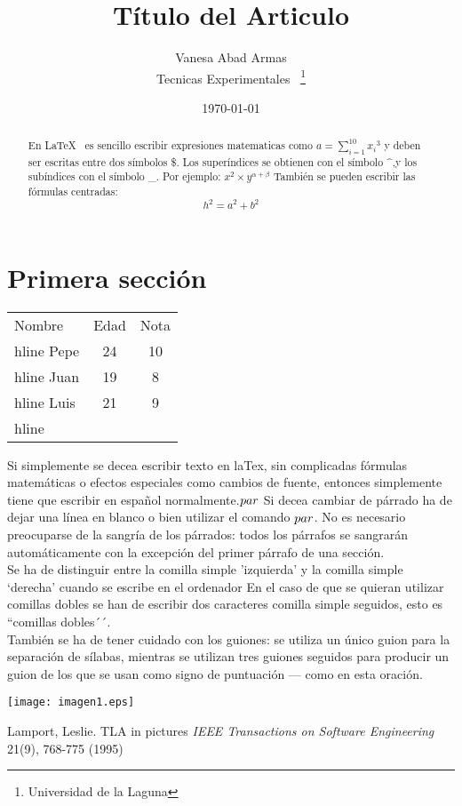 \documentclass[a4paper,12pt]{article}
\begin{document}
\title{Título del Articulo}
\author{Vanesa Abad Armas\\
	Tecnicas Experimentales ~\footnote{Universidad de la Laguna}
	}
\date{\today}
\maketitle
\begin{abstract}
   En \LaTeX{}~\cite{Lam:86} es sencillo escribir expresiones
matematicas como $a=\sum_{i=1}^{10}{x_i}^{3} $
y deben ser escritas entre dos símbolos \$.
Los superíndices se obtienen con el símbolo \^{},y
los subíndices con el símbolo \_.
Por ejemplo: $x^2 \times y^{\alpha + \beta}$
También se pueden escribir las fórmulas centradas:
\[h^2=a^2 + b^2\]
\end{abstract}
\section{Primera sección}
\bigskip
\begin{tabular}{|l|c|c|}
\hline
  Nombre & Edad & Nota \\hline
  Pepe	 &  24  & 10	\\hline
  Juan	 &  19  & 8	\\hline
  Luis   &  21  & 9 	\\hline
\end{tabular}
Si simplemente se decea escribir texto en laTex,
sin complicadas f\'ormulas matem\'aticas o efectos especiales
como cambios de fuente, entonces simplemente tiene que escribir
en español normalmente.$\\par$
Si decea cambiar de párrado ha de dejar una línea en blanco o bien
utilizar el comando $\\par$.
No es necesario preocuparse de la sangría de los párrados:
todos los párrafos se sangrarán automáticamente con la excepción
del primer párrafo de una sección.\\
Se ha de distinguir entre la comilla simple 'izquierda'
y la comilla simple `derecha' cuando se escribe en el ordenador
En el caso de que se quieran utilizar comillas dobles se han de
escribir dos caracteres comilla simple seguidos, esto es
``comillas dobles´´.\\
También se ha de tener cuidado con los guiones: se utiliza un único
guion para la separación de sílabas, mientras se utilizan
tres guiones seguidos para producir un guion de los que se usan 
como signo de puntuación --- como en esta oración. 

\texttt{[image: imagen1.eps]}

\begin{thebibliography}{00}
    Lamport, Leslie.
    TLA in pictures
    \emph{IEEE Transactions on Software Engineering}
    21(9), 768-775
    (1995)
\end{thebibliography}
\end{document}
